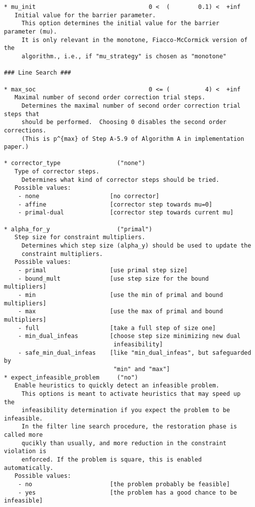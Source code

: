 \documentclass[letter,10pt]{article}
\begin{document}
{\begin{verbatim}
* mu_init                                0 <  (        0.1) <  +inf      
   Initial value for the barrier parameter.
     This option determines the initial value for the barrier parameter (mu). 
     It is only relevant in the monotone, Fiacco-McCormick version of the
     algorithm., i.e., if "mu_strategy" is chosen as "monotone"

### Line Search ###

* max_soc                                0 <= (          4) <  +inf      
   Maximal number of second order correction trial steps.
     Determines the maximal number of second order correction trial steps that
     should be performed.  Choosing 0 disables the second order corrections.
     (This is p^{max} of Step A-5.9 of Algorithm A in implementation paper.)

* corrector_type                ("none")
   Type of corrector steps.
     Determines what kind of corrector steps should be tried.
   Possible values:
    - none                    [no corrector]
    - affine                  [corrector step towards mu=0]
    - primal-dual             [corrector step towards current mu]

* alpha_for_y                   ("primal")
   Step size for constraint multipliers.
     Determines which step size (alpha_y) should be used to update the
     constraint multipliers.
   Possible values:
    - primal                  [use primal step size]
    - bound_mult              [use step size for the bound multipliers]
    - min                     [use the min of primal and bound multipliers]
    - max                     [use the max of primal and bound multipliers]
    - full                    [take a full step of size one]
    - min_dual_infeas         [choose step size minimizing new dual
                               infeasibility]
    - safe_min_dual_infeas    [like "min_dual_infeas", but safeguarded by
                               "min" and "max"]
* expect_infeasible_problem     ("no")
   Enable heuristics to quickly detect an infeasible problem.
     This options is meant to activate heuristics that may speed up the
     infeasibility determination if you expect the problem to be infeasible. 
     In the filter line search procedure, the restoration phase is called more
     qucikly than usually, and more reduction in the constraint violation is
     enforced. If the problem is square, this is enabled automatically.
   Possible values:
    - no                      [the problem probably be feasible]
    - yes                     [the problem has a good chance to be infeasible]


\end{verbatim}}
\end{document}
